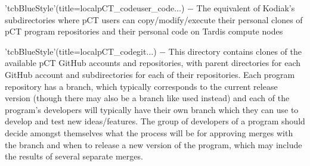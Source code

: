 \begin{tcbenvironment}
\begin{tcbparagraph}'tcbBlueStyle'(title=\dirsep local\dirsep pCT\_code\dirsep user\_code\dirsep{}\dirsep$\dots$)
$\boldsymbol{-}$ The equivalent of Kodiak's  subdirectories where pCT users can copy/modify/execute their personal clones of pCT program repositories and their personal code on Tardis compute nodes
\end{tcbparagraph}
\begin{tcbparagraph}'tcbBlueStyle'(title=\dirsep local\dirsep pCT\_code\dirsep git\dirsep{}\dirsep{}\dirsep $\dots$)
$\boldsymbol{-}$ This directory contains clones of the available pCT GitHub accounts and repositories, with parent directories for each GitHub account and subdirectories for each of their repositories.  Each program repository has a  branch, which typically corresponds to the current release version (though there may also be a branch like  used instead) and each of the program's developers will typically have their own branch which they can use to develop and test new ideas/features.  The group of developers of a program should decide amongst themselves what the process will be for approving merges with the  branch and when to release a new version of the program, which may include the results of several separate merges.\\\par


\end{tcbparagraph}
\end{tcbenvironment}
